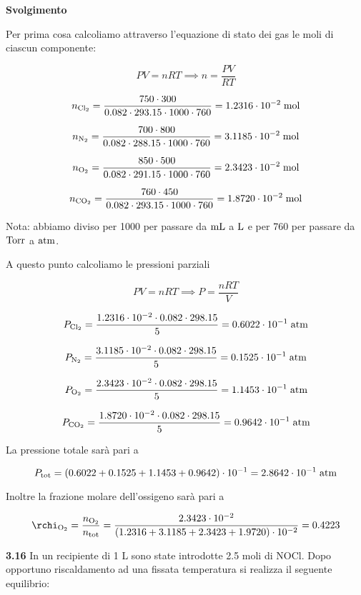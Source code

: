 \vspace{0.2cm}\large\textbf{Svolgimento}\normalsize

\vspace{0.2cm}Per prima cosa calcoliamo attraverso l'equazione di stato dei gas le moli di ciascun componente:

$$PV=nRT \implies n=\frac{PV}{RT}$$

$$n_{\rm Cl_2}=\frac{750 \cdot 300}{0.082 \cdot 293.15 \cdot 1000 \cdot 760}=1.2316 \cdot 10^{-2} \; \rm mol$$

$$n_{\rm N_2}=\frac{700 \cdot 800}{0.082 \cdot 288.15 \cdot 1000 \cdot 760}=3.1185 \cdot 10^{-2} \; \rm mol$$

$$n_{\rm O_2}=\frac{850 \cdot 500}{0.082 \cdot 291.15 \cdot 1000 \cdot 760}=2.3423 \cdot 10^{-2} \; \rm mol$$

$$n_{\rm CO_2}=\frac{760 \cdot 450}{0.082 \cdot 293.15 \cdot 1000 \cdot 760}=1.8720 \cdot 10^{-2} \; \rm mol$$

Nota: abbiamo diviso per 1000 per passare da $\rm mL$ a $\rm L$ e per 760 per passare da $\rm Torr$ a $\rm atm$.

A questo punto calcoliamo le pressioni parziali

$$PV=nRT \implies P=\frac{nRT}{V}$$

$$P_{\rm Cl_2}
=\frac{1.2316 \cdot 10^{-2} \cdot 0.082 \cdot 298.15}{5}
=0.6022 \cdot 10^{-1} \; \rm atm$$

$$P_{\rm N_2}
=\frac{3.1185 \cdot 10^{-2} \cdot 0.082 \cdot 298.15}{5}
=0.1525 \cdot 10^{-1} \; \rm atm$$

$$P_{\rm O_2}
=\frac{2.3423 \cdot 10^{-2} \cdot 0.082 \cdot 298.15}{5}
=1.1453 \cdot 10^{-1} \; \rm atm$$

$$P_{\rm CO_2}
=\frac{1.8720 \cdot 10^{-2} \cdot 0.082 \cdot 298.15}{5}
=0.9642 \cdot 10^{-1} \; \rm atm$$

La pressione totale sarà pari a

$$P_{\rm tot}=(0.6022 + 0.1525 + 1.1453 + 0.9642) \cdot 10^{-1}
=2.8642 \cdot 10^{-1} \; \rm atm$$

Inoltre la frazione molare dell'ossigeno sarà pari a

$$\rchi_{\rm O_2}
=\frac{n_{\rm O_2}}{n_{\rm tot}}
=\frac{2.3423 \cdot 10^{-2}}{(1.2316 + 3.1185 + 2.3423 + 1.9720) \cdot 10^{-2}}
=0.4223$$

\vspace{0.2cm}\textbf{3.16} In un recipiente di 1 L sono state introdotte 2.5 moli di NOCl. Dopo opportuno riscaldamento ad una fissata temperatura si realizza il seguente equilibrio:

